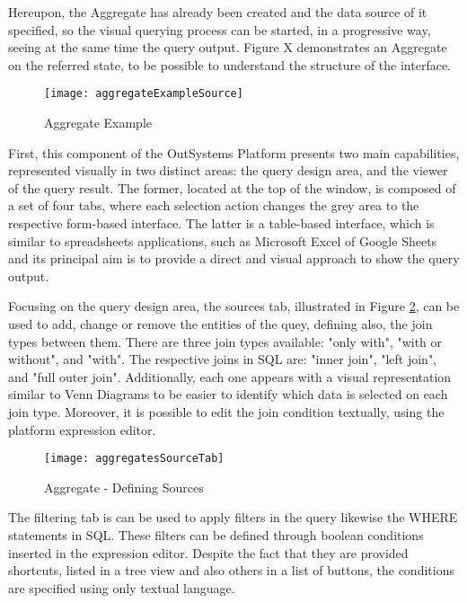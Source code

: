 
Hereupon, the Aggregate has already been created and the data source of it specified, so the visual querying process can be started, in a progressive way, seeing at the same time the query output. Figure X demonstrates an Aggregate on the referred state, to be possible to understand the structure of the interface.

\begin{figure}[htbp]
	\centering
	\texttt{[image: aggregateExampleSource]}
	\caption{Aggregate Example}
	\label{fig:aggregate_created}
\end{figure}

First, this component of the OutSystems Platform presents two main capabilities, represented visually in two distinct areas: the query design area, and the viewer of the query result. The former, located at the top of the window, is composed of a set of four tabs, where each selection action changes the grey area to the respective form-based interface. The latter is a table-based interface, which is similar to spreadsheets applications, such as Microsoft Excel \cite{microsoftExcel} of Google Sheets \cite{googleSheets} and its principal aim is to provide a direct and visual approach to show the query output.

Focusing on the query design area, the sources tab, illustrated in Figure \ref{fig:aggregates_source_tab}, can be used to add, change or remove the entities of the quey, defining also, the join types between them. There are three join types available: "only with", "with or without", and "with". The respective joins in SQL are: "inner join", "left join", and "full outer join". Additionally, each one appears with a visual representation similar to Venn Diagrams \cite{venn1880diagrams} to be easier to identify which data is selected on each join type. Moreover, it is possible to edit the join condition textually, using the platform expression editor.

\begin{figure}[htbp]
	\centering
	\texttt{[image: aggregatesSourceTab]}
	\caption{Aggregate - Defining Sources}
	\label{fig:aggregates_source_tab}
\end{figure}

The filtering tab is can be used to apply filters in the query likewise the WHERE statements in SQL. These filters can be defined through boolean conditions inserted in the expression editor. Despite the fact that they are provided shortcuts, listed in a tree view and also others in a list of buttons, the conditions are specified using only textual language. 

